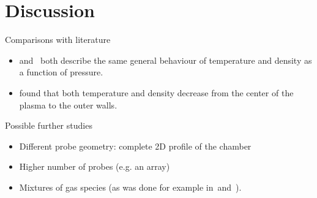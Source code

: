 \documentclass[10pt]{beamer}
\begin{document}
\section{Discussion}
\begin{frame}{Comparisons with literature}
    \begin{itemize}
        \item {} and \,  both describe the same general behaviour of temperature and density as a function of pressure.
        \item {} found that both temperature and density decrease from the center of the plasma to the outer walls.
    \end{itemize}
\end{frame}




\begin{frame}{Possible further studies}
    \begin{itemize}
        \item Different probe geometry: complete 2D profile of the chamber
        \item Higher number of probes (e.g. an array)
        \item Mixtures of gas species (as was done for example in\,  and\, ).
    \end{itemize}
\end{frame}
\end{document}
